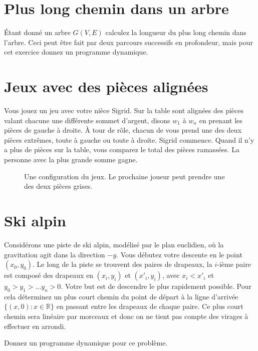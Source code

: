 \documentclass[12pt]{article}
\begin{document}
\section{Plus long chemin dans un arbre}

Étant donné un arbre $G(V,E)$ calculez la longueur du plus long chemin dans l'arbre.  Ceci peut être fait par deux parcours successifs en profondeur, mais pour cet exercice donnez un programme dynamique.

\section{Jeux avec des pièces alignées}

Vous jouez un jeu avec votre nièce Sigrid.  Sur la table sont alignées des pièces valant chacune une différente sommet d'argent, disons $w_1$ à $w_n$ en prenant les pièces de gauche à droite.  À tour de rôle, chacun de vous prend une des deux pièces extrêmes, toute à gauche ou toute à droite.  Sigrid commence. Quand il n'y a plus de pièces sur la table, vous comparez le total des pièces ramassées.  La personne avec la plus grande somme gagne.
\begin{figure}[ht]
\begin{center}
\end{center}
\caption{Une configuration du jeux. Le prochaine joueur peut prendre une des deux pièces grises.}
\end{figure}


\section{Ski alpin}

Considérons une piste de ski alpin, modélisé par le plan euclidien, où la gravitation agit dans la direction $-y$. Vous débutez votre descente en le  point $(x_0,y_0)$. Le long de la piste se trouvent des paires de drapeaux, la $i$-ième paire est composé des drapeaux en $(x_i,y_i)$ et $(x'_i,y_i)$, avec $x_i < x'_i$ et $y_0 > y_1 > \ldots y_n > 0$.  Votre but est de descendre le plus rapidement possible.  Pour cela déterminez un plus court chemin du point de départ à la ligne d'arrivée $\{(x,0):x\in \mathbb R\}$ en passant entre les drapeaux de chaque paire.  Ce plus court chemin sera linéaire par morceaux et donc on ne tient pas compte des virages à effectuer en arrondi.

Donnez un programme dynamique pour ce problème.
\end{document}
